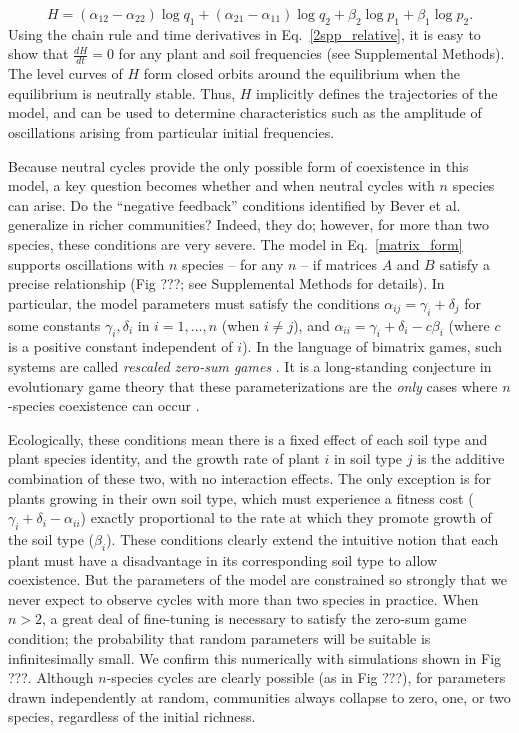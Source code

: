 \documentclass[11pt]{article}
\begin{document}
\begin{equation}
	H = (\alpha_{12} - \alpha_{22}) \log q_1 + (\alpha_{21} - \alpha_{11}) \log q_2 + \beta_2 \log p_1 + \beta_1 \log p_2 .
\end{equation} 
Using the chain rule and time derivatives in Eq.~\ref{2spp_relative}, it is easy to show that $\frac{dH}{dt} = 0$ for any plant and soil frequencies (see Supplemental Methods). The level curves of $H$ form closed orbits around the equilibrium when the equilibrium is neutrally stable. Thus, $H$ implicitly defines the trajectories of the model, and can be used to determine characteristics such as the amplitude of oscillations arising from particular initial frequencies.

Because neutral cycles provide the only possible form of coexistence in this model, a key question becomes whether and when neutral cycles with $n$ species can arise. Do the ``negative feedback'' conditions identified by Bever et al. generalize in richer communities? Indeed, they do; however, for more than two species, these conditions are very severe. The model in Eq.~\ref{matrix_form} supports oscillations with $n$ species -- for any $n$ -- if matrices $A$ and $B$ satisfy a precise relationship (Fig ???; see Supplemental Methods for details). In particular, the model parameters must satisfy the conditions $\alpha_{ij} = \gamma_i + \delta_j$ for some constants $\gamma_i, \delta_i$ in $i = 1, \dots, n$ (when $i \neq j$), and $\alpha_{ii} = \gamma_i + \delta_i- c \beta_i$ (where $c$ is a positive constant independent of $i$). In the language of bimatrix games, such systems are called \emph{rescaled zero-sum games} \citep{hofbauer1996evolutionary,hofbauer1998evolutionary}. It is a long-standing conjecture in evolutionary game theory that these parameterizations are the \emph{only} cases where $n$-species coexistence can occur \citep{hofbauer1996evolutionary,hofbauer2011deterministic}.

Ecologically, these conditions mean there is a fixed effect of each soil type and plant species identity, and the growth rate of plant $i$ in soil type $j$ is the additive combination of these two, with no interaction effects. The only exception is for plants growing in their own soil type, which must experience a fitness cost ($\gamma_i + \delta_i - \alpha_{ii}$) exactly proportional to the rate at which they promote growth of the soil type ($\beta_i$).  
These conditions clearly extend the intuitive notion that each plant must have a disadvantage in its corresponding soil type to allow coexistence. But the parameters of the model are constrained so strongly that we never expect to observe cycles with more than two species in practice. When $n > 2$, a great deal of fine-tuning is necessary to satisfy the zero-sum game condition; the probability that random parameters will be suitable is infinitesimally small. We confirm this numerically with simulations shown in Fig ???. Although $n$-species cycles are clearly possible (as in Fig ???), for parameters drawn independently at random, communities always collapse to zero, one, or two species, regardless of the initial richness. 
\end{document}
